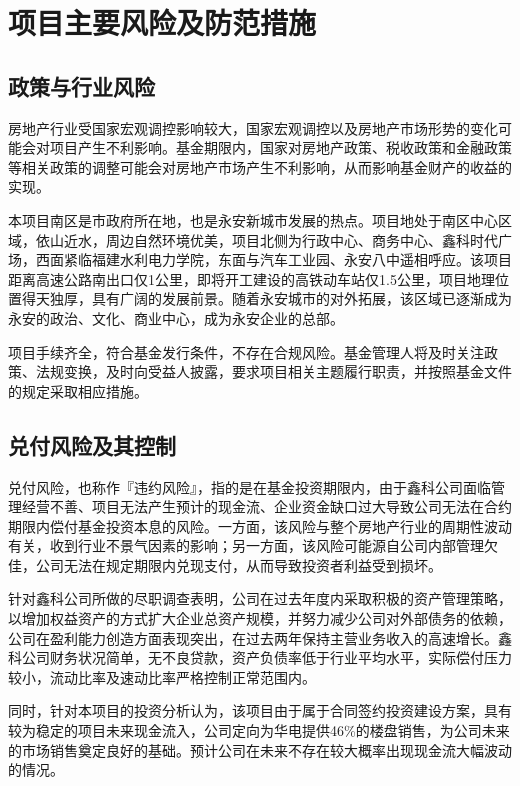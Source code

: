 
\chapter{项目主要风险及防范措施} 
\label{chap05}

\section{政策与行业风险}
房地产行业受国家宏观调控影响较大，国家宏观调控以及房地产市场形势的变化可能会对项目产生不利影响。基金期限内，国家对房地产政策、税收政策和金融政策等相关政策的调整可能会对房地产市场产生不利影响，从而影响基金财产的收益的实现。

\begin{mdfbox}[防范措施]
\hspace{2em}本项目南区是市政府所在地，也是永安新城市发展的热点。项目地处于南区中心区域，依山近水，周边自然环境优美，项目北侧为行政中心、商务中心、鑫科时代广场，西面紧临福建水利电力学院，东面与汽车工业园、永安八中遥相呼应。该项目距离高速公路南出口仅1公里，即将开工建设的高铁动车站仅1.5公里，项目地理位置得天独厚，具有广阔的发展前景。随着永安城市的对外拓展，该区域已逐渐成为永安的政治、文化、商业中心，成为永安企业的总部。

项目手续齐全，符合基金发行条件，不存在合规风险。基金管理人将及时关注政策、法规变换，及时向受益人披露，要求项目相关主题履行职责，并按照基金文件的规定采取相应措施。
\end{mdfbox}


\section{兑付风险及其控制}
兑付风险，也称作『违约风险』，指的是在基金投资期限内，由于鑫科公司面临管理经营不善、项目无法产生预计的现金流、企业资金缺口过大导致公司无法在合约期限内偿付基金投资本息的风险。一方面，该风险与整个房地产行业的周期性波动有关，收到行业不景气因素的影响；另一方面，该风险可能源自公司内部管理欠佳，公司无法在规定期限内兑现支付，从而导致投资者利益受到损坏。

\begin{mdfbox}[防范措施]
\hspace{2em}针对鑫科公司所做的尽职调查表明，公司在过去年度内采取积极的资产管理策略，以增加权益资产的方式扩大企业总资产规模，并努力减少公司对外部债务的依赖，公司在盈利能力创造方面表现突出，在过去两年保持主营业务收入的高速增长。鑫科公司财务状况简单，无不良贷款，资产负债率低于行业平均水平，实际偿付压力较小，流动比率及速动比率严格控制正常范围内。

同时，针对本项目的投资分析认为，该项目由于属于合同签约投资建设方案，具有较为稳定的项目未来现金流入，公司定向为华电提供46\%的楼盘销售，为公司未来的市场销售奠定良好的基础。预计公司在未来不存在较大概率出现现金流大幅波动的情况。
\end{mdfbox}

